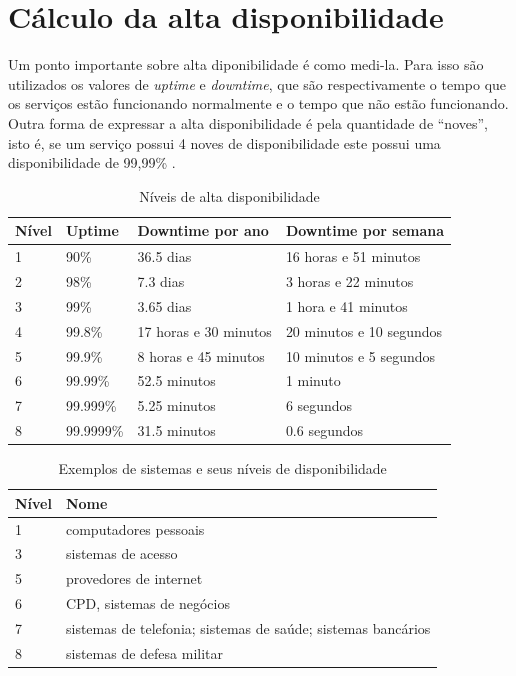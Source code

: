 \section{Cálculo da alta disponibilidade}

Um ponto importante sobre alta diponibilidade é como medi-la. Para isso são utilizados os valores de \textit{uptime} e 
\textit{downtime}, que são respectivamente o tempo que os serviços estão funcionando normalmente e o tempo que não estão funcionando.
Outra forma de expressar a alta disponibilidade é pela quantidade de ``noves'', isto é, se um serviço possui 4 noves de disponibilidade
este possui uma disponibilidade de 99,99\% \cite{pereirafilho2004}.

\begin{table}
\caption {Níveis de alta disponibilidade}
\label{tab:dispniveis} 
\begin{center}
\begin{tabular}{|l|l|l|l|}\hline
Nível & Uptime & Downtime por ano & Downtime por semana\\\hline
1 & 90\% & 36.5 dias & 16 horas e 51 minutos\\\hline
2 & 98\% & 7.3 dias & 3 horas e 22 minutos\\\hline
3 & 99\% & 3.65 dias & 1 hora e 41 minutos\\\hline
4 & 99.8\% & 17 horas e 30 minutos & 20 minutos e 10 segundos\\\hline
5 & 99.9\% & 8 horas e 45 minutos & 10 minutos e 5 segundos\\\hline
6 & 99.99\% & 52.5 minutos & 1 minuto\\\hline
7 & 99.999\% & 5.25 minutos & 6 segundos\\\hline
8 & 99.9999\% & 31.5 minutos & 0.6 segundos\\\hline
\end{tabular}
\end{center}
\end{table}

\begin{table}
\caption {Exemplos de sistemas e seus níveis de disponibilidade}
\label{tab:dispexemplos} 
\begin{center}
\begin{tabular}{|l|l|}\hline
Nível  & Nome\\\hline
1 & computadores pessoais\\\hline
3 & sistemas de acesso\\\hline
5 & provedores de internet\\\hline
6 & CPD, sistemas de negócios\\\hline
7 & sistemas de telefonia; sistemas de saúde; sistemas bancários\\\hline
8 & sistemas de defesa militar\\\hline
\end{tabular}
\end{center}
\end{table}

